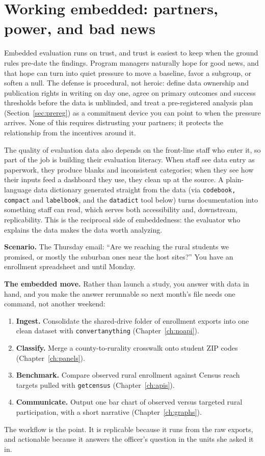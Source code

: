 \documentclass[
    a4paper,
    fontsize=10pt,
    twoside=true,
    numbers=noenddot,
]{kaobook}
\newcounter{appliedexample}
\newenvironment{appliedexample}[1][]{%
    \refstepcounter{appliedexample}%
    \begin{appliedexamplebox}[frametitle={Applied Example~\theappliedexample.~~#1}]%
}{%
    \end{appliedexamplebox}%
}
\begin{document}
\section{Working embedded: partners, power, and bad news}\label{sec:literacy}
Embedded evaluation runs on trust, and trust is easiest to keep when the ground rules pre-date the findings. Program managers naturally hope for good news, and that hope can turn into quiet pressure to move a baseline, favor a subgroup, or soften a null. The defense is procedural, not heroic: define data ownership and publication rights in writing on day one, agree on primary outcomes and success thresholds before the data is unblinded, and treat a pre-registered analysis plan (Section~\ref{sec:prereg}) as a commitment device you can point to when the pressure arrives. None of this requires distrusting your partners; it protects the relationship from the incentives around it.

The quality of evaluation data also depends on the front-line staff who enter it, so part of the job is building their evaluation literacy. When staff see data entry as paperwork, they produce blanks and inconsistent categories; when they see how their inputs feed a dashboard they use, they clean up at the source. A plain-language data dictionary generated straight from the data (via \texttt{codebook, compact} and \texttt{labelbook}, and the \texttt{datadict} tool below) turns documentation into something staff can read, which serves both accessibility and, downstream, replicability. This is the reciprocal side of embeddedness: the evaluator who explains the data makes the data worth analyzing.

\begin{appliedexample}[From a funder's question to a one-page answer]
\textbf{Scenario.} The Thursday email: \enquote{Are we reaching the rural students we promised, or mostly the suburban ones near the host sites?} You have an enrollment spreadsheet and until Monday.

\medskip
\textbf{The embedded move.} Rather than launch a study, you answer with data in hand, and you make the answer rerunnable so next month's file needs one command, not another weekend:
\begin{enumerate}
    \item \textbf{Ingest.} Consolidate the shared-drive folder of enrollment exports into one clean dataset with \texttt{convertanything} (Chapter~\ref{ch:noapi}).
    \item \textbf{Classify.} Merge a county-to-rurality crosswalk onto student ZIP codes (Chapter~\ref{ch:panels}).
    \item \textbf{Benchmark.} Compare observed rural enrollment against Census reach targets pulled with \texttt{getcensus} (Chapter~\ref{ch:apis}).
    \item \textbf{Communicate.} Output one bar chart of observed versus targeted rural participation, with a short narrative (Chapter~\ref{ch:graphs}).
\end{enumerate}
The workflow is the point. It is replicable because it runs from the raw exports, and actionable because it answers the officer's question in the units she asked it in.
\end{appliedexample}
\end{document}
